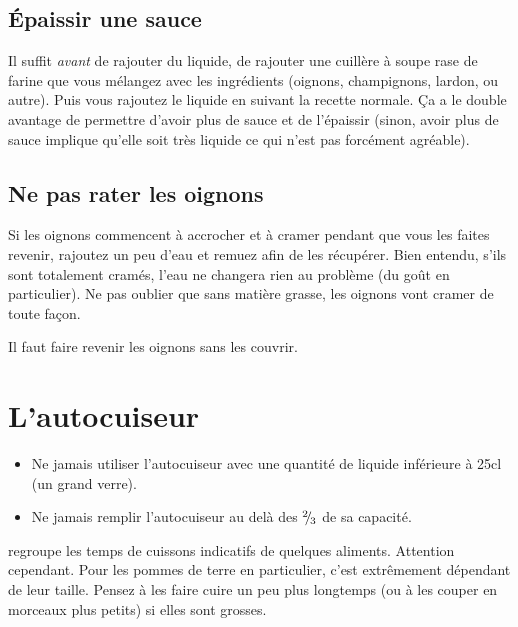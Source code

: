 \documentclass[a4paper,twoside]{report}
\begin{document}
\subsection{Épaissir une sauce}
Il suffit \emph{avant} de rajouter du liquide, de rajouter une cuillère à soupe rase de farine que vous mélangez avec les ingrédients (oignons, champignons, lardon, ou autre). Puis vous rajoutez le liquide en suivant la recette normale. Ça a le double avantage de permettre d'avoir plus de sauce et de l'épaissir (sinon, avoir plus de sauce implique qu'elle soit très liquide ce qui n'est pas forcément agréable).

\subsection{Ne pas rater les oignons}
Si les oignons commencent à accrocher et à cramer pendant que vous les faites revenir, rajoutez un peu d'eau et remuez afin de les récupérer. Bien entendu, s'ils sont totalement cramés, l'eau ne changera rien au problème (du goût en particulier). Ne pas oublier que sans matière grasse, les oignons vont cramer de toute façon.

\begin{remarque}
Il faut faire revenir les oignons sans les couvrir.
\end{remarque}


\section{L'autocuiseur}
\begin{attention}
\begin{itemize}
\item Ne jamais utiliser l'autocuiseur avec une quantité de liquide inférieure à 25cl (un grand verre).
\item Ne jamais remplir l'autocuiseur au delà des ${{}^{2\!\!}/ _{\!3}}$ de sa capacité.
\end{itemize}
\end{attention}

 regroupe les temps de cuissons indicatifs de quelques aliments. Attention cependant. Pour les pommes de terre en particulier, c'est extrêmement dépendant de leur taille. Pensez à les faire cuire un peu plus longtemps (ou à les couper en morceaux plus petits) si elles sont grosses.
\end{document}
